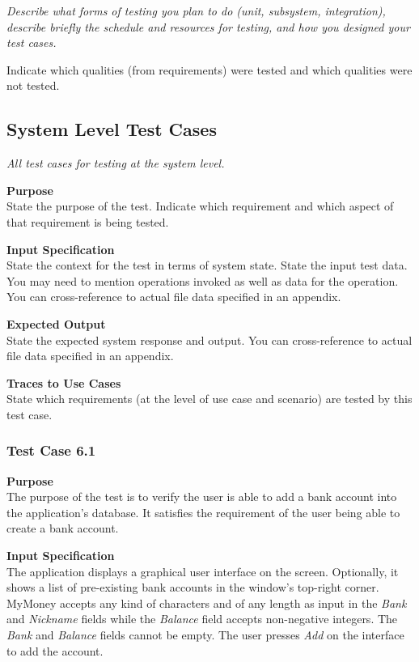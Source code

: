 \documentclass[12pt]{article}
\begin{document}
{\it
Describe what forms of testing you plan to do (unit, subsystem, integration),
describe briefly the schedule and resources for testing,
and
how you designed your test cases.

Indicate which qualities (from requirements) were tested and which qualities were not tested.
}

\subsection{System Level Test Cases}
{\it
All test cases for testing at the system level.}

\noindent
{\bf Purpose}\\
State the purpose of the test.
Indicate which requirement and which aspect of that requirement is being tested.

\noindent
{\bf Input Specification}\\
State the context for the test in terms of system state.
State the input test data. You may need to mention operations invoked as well as data for the operation.
You can cross-reference to actual file data specified in an appendix.

\noindent
{\bf Expected Output}\\
State the expected system response and output.
You can cross-reference to actual file data specified in an appendix.

\noindent
{\bf Traces to Use Cases}\\
State which requirements (at the level of use case and scenario) are tested by this test case.
\clearpage

\subsubsection{Test Case 6.1} \label{6.1}

\noindent
{\bf Purpose}\\
The purpose of the test is to verify the user is able to add a bank account into the application's database.
It satisfies the requirement of the user being able to create a bank account.

\noindent
    {\bf Input Specification}\\
    The application displays a graphical user interface on the screen.
    Optionally, it shows a list of pre-existing bank accounts in the window's top-right corner.
    MyMoney accepts any kind of characters and of any length as input in the \textit{Bank} and \textit{Nickname} fields while
    the \textit{Balance} field accepts non-negative integers. The \textit{Bank} and \textit{Balance} fields cannot be empty.
    The user presses \textit{Add} on the interface to add the account.
    
\end{document}
